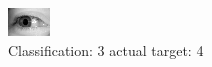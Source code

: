 \begin{figure}[h!]
\begin{center}
\includegraphics[width=0.60\columnwidth]{figures/ID3129_class_3_target_4.png}
\end{center}
\caption{ Classification: 3 actual target: 4}
\label{fig:ID3129_class_3_target_4}
\end{figure}
